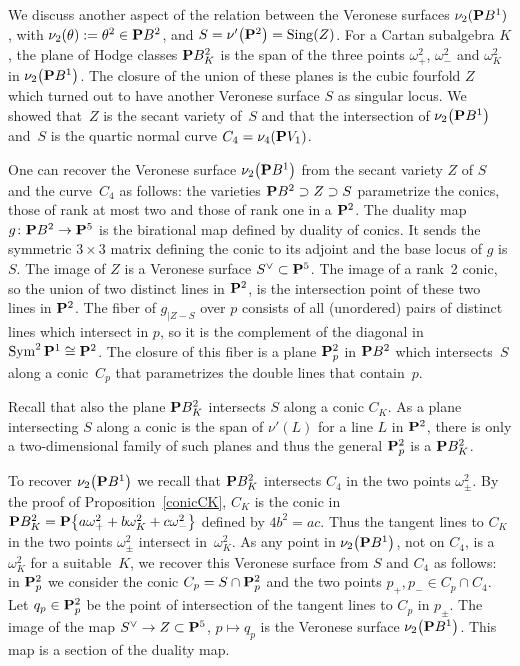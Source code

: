 \documentclass[10pt,a4paper]{amsart}
\numberwithin{equation}{section}
\begin{document}
\begin{Remark}\label{remveroneses}
We discuss another aspect of the relation between the Veronese surfaces $\nu_2({\bf P} B^1)$,
with $\nu_2(\theta):=\theta^2\in {\bf P} B^2$, and $S=\nu'\big({\bf P}^2\big)=\operatorname{Sing}(Z)$.
For a Cartan subalgebra $K$, the plane of Hodge classes ${\bf P} B^2_K$ is the span of the
three points $\omega_+^2$, $\omega_-^2$ and $\omega_K^2$ in $\nu_2\big({\bf P} B^1\big)$. The closure of
the union of these planes is the cubic fourfold $Z$ which turned out to have another Veronese surface
$S$ as singular locus.
We showed that~$Z$ is the secant variety of~$S$
and that the intersection of $\nu_2\big({\bf P} B^1\big)$ and~$S$ is the quartic normal curve
$C_4=\nu_4({\bf P} V_1)$.

One can recover the Veronese surface $\nu_2\big({\bf P} B^1\big)$ from the secant variety $Z$ of $S$ and the
curve~$C_4$ as follows: the varieties ${\bf P} B^2\supset Z\supset S$
parametrize the conics, those of rank at most two and those of rank one in a ${\bf P}^2$.
The duality map $g\colon {\bf P} B^2\rightarrow {\bf P}^5$ is the birational map defined by
duality of conics. It sends the symmetric $3\times 3$ matrix defining the conic to its adjoint and
the base locus of $g$ is $S$.
The image of $Z$ is a Veronese surface $S^\vee\subset{\bf P}^5$. The image of a rank~2 conic,
so the union of two distinct lines in ${\bf P}^2$, is the intersection point of these two lines in ${\bf P}^2$.
The fiber of $g_{|Z-S}$ over $p$ consists of all (unordered) pairs of distinct lines
which intersect in $p$, so it is the complement of the diagonal in $\operatorname{Sym}^2{\bf P}^1\cong {\bf P}^2$.
The closure of this fiber is a plane ${\bf P}^2_p$ in ${\bf P} B^2$ which intersects~$S$ along a conic~$C_p$
that parametrizes the double lines that contain~$p$.

Recall that also the plane ${\bf P} B^2_K$ intersects $S$ along a conic $C_K$. As a plane intersecting
$S$ along a conic is the span of $\nu'(L)$ for a line $L$ in ${\bf P}^2$, there is only
a two-dimensional family of such planes and thus the general ${\bf P}^2_p$ is a ${\bf P} B^2_K$.

To recover $\nu_2\big({\bf P} B^1\big)$ we recall that ${\bf P} B^2_K$ intersects $C_4$ in the two points $\omega_\pm^2$.
By the proof of Proposition~\ref{conicCK},
$C_K$ is the conic in ${\bf P} B^2_K={\bf P}\big\{a\omega_+^2+b\omega_K^2+c\omega_-^2\big\}$ defined by $4b^2=ac$.
Thus the tangent lines to $C_K$ in the two points $\omega_\pm^2$ intersect in~$\omega_K^2$.
As any point in $\nu_2\big({\bf P} B^1\big)$, not on $C_4$, is a $\omega_K^2$ for a suitable~$K$,
we recover this Veronese surface from $S$ and $C_4$ as follows: in ${\bf P}^2_p$ we consider
the conic $C_p=S\cap {\bf P}^2_p$ and the two points $p_+,p_-\in C_p\cap C_4$. Let
$q_p\in {\bf P}^2_p$ be the point of intersection of the tangent lines to $C_p$ in $p_\pm$.
The image of the map $S^\vee\rightarrow Z\subset {\bf P}^5$, $p\mapsto q_p$
is the Veronese surface $\nu_2\big({\bf P} B^1\big)$. This map is a section of the duality map.
\end{Remark}
\end{document}
